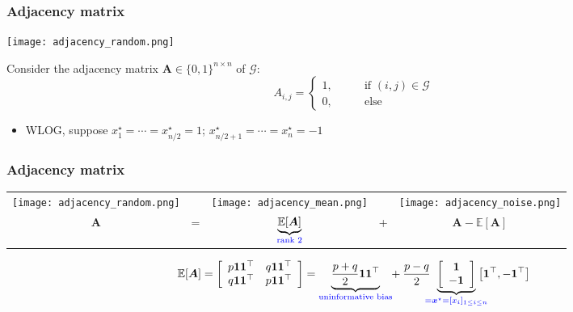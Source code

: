 \documentclass[compress,
mathserif,wide,%
]{beamer}
\begin{document}
\begin{frame}
\frametitle{Adjacency matrix}



\begin{center}
\texttt{[image: adjacency\_random.png]} 
\end{center}


Consider the adjacency matrix $\bm{A}\in \{0,1\}^{n\times n}$ of $\mathcal{G}$: 
%
\[
	A_{i,j} = \begin{cases}  1, \qquad & \text{if } (i,j) \in \mathcal{G} \\ 0, & \text{else} \end{cases}
\]

\vspace{-0.5em}
\begin{itemize}
	\item WLOG, suppose $x_1^{\star}=\cdots=x_{n/2}^{\star}=1$; $x_{n/2+1}^{\star}=\cdots=x_n^{\star}=-1$ 
\end{itemize}


\end{frame}




\begin{frame}
\frametitle{Adjacency matrix}


		
\begin{center}
\begin{tabular}{ccccc}
\texttt{[image: adjacency\_random.png]} &   & \texttt{[image: adjacency\_mean.png]} &  & \texttt{[image: adjacency\_noise.png]}\tabularnewline
	$\bm{A}$ & = & $\underset{\textcolor{blue}{ \text{rank 2}}}{\underbrace{\mathbb{E}[\bm{A}]}}$ & + & $\bm{A}-\mathbb{E}\left[\bm{A}\right]$\tabularnewline
\end{tabular}
\end{center}


{\small $$\mathbb{E}[\bm{A}]=\left[\begin{array}{cc}
p\bm{1}\bm{1}^{\top} & q\bm{1}\bm{1}^{\top}\\
q\bm{1}\bm{1}^{\top} & p\bm{1}\bm{1}^{\top}
\end{array}\right]=\underset{\textcolor{blue}{ \text{uninformative bias}}}{\underbrace{\frac{p+q}{2}\bm{1}\bm{1}^{\top}}} \hspace{-0.3em} +\frac{p-q}{2} \hspace{-0.5em}\underset{\textcolor{blue}{ =\bm{x}^{\star}=[x_i]_{1\leq i\leq n}}}{\underbrace{\left[\begin{array}{c}
\bm{1}\\
-\bm{1}
\end{array}\right]}} \hspace{-1em} \left[\bm{1}^{\top},-\bm{1}^{\top}\right]$$ }

		
\end{frame}
\end{document}

